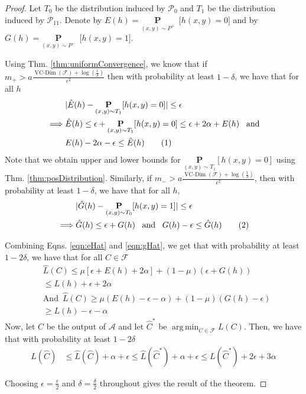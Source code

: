 \documentclass[12pt]{article}
\newcommand{\mb}{\mathbf}
\newcommand{\mc}{\mathcal}
\newcommand\numberthis{\addtocounter{equation}{1}\tag{\theequation}}
\DeclareMathOperator*{\argmin}{arg\,min}
\DeclareMathOperator*{\vcdim}{VC-Dim}
\begin{document}
\begin{proof}
Let $T_0$ be the distribution induced by $\mc P_0$ and $T_1$ be the distribution induced by $\mc P_{11}$. Denote by $E(h) = \underset{(x, y) \sim P^+}{\mb P}\enspace \big[ h(x, y) = 0 ]$ and by $G(h) = \underset{(x, y) \sim P^-}{\mb P}\enspace \big[ h(x, y) = 1 ]$. 

Using Thm. \ref{thm:uniformConvergence}, we know that if $m_+ > a\frac{\vcdim({\mc F}) + \log(\frac{1}{\delta})}{\epsilon^2}$ then with probability at least $1-\delta$, we have that for all $h$
\begin{align*}
  &|\hat E(h) - \underset{(x,y) \sim T_1}{\mb P}[h(x, y) = 0]| \le \epsilon\\
  \implies &\hat E(h) \le \epsilon + \underset{(x,y) \sim T_1}{\mb P}[h(x, y) = 0] \le \epsilon + 2\alpha + E(h) \enspace\text{ and}\\
  &E(h) - 2\alpha -\epsilon \le \hat E(h) \numberthis \label{eqn:eHat}
\end{align*}
Note that we obtain upper and lower bounds for $\underset{(x,y) \sim T_1}{\mb P}[h(x, y) = 0]$ using Thm. \ref{thm:posDistribution}. Similarly, if $m_- > a\frac{\vcdim({\mc F}) + \log(\frac{1}{\delta})}{\epsilon^2}$, then with probability at least $1-\delta$, we have that for all $h$,
\begin{align*}
  &|\hat G(h) - \underset{(x,y) \sim T_0}{\mb P}[h(x, y) = 1]| \le \epsilon\\
  \implies &\hat G(h) \le \epsilon + G(h) \enspace\text{ and } \enspace G(h) -\epsilon \le \hat G(h) \numberthis\label{eqn:gHat}
\end{align*}

\noindent Combining Eqns. \ref{eqn:eHat} and \ref{eqn:gHat}, we get that with probability at least $1-2\delta$, we have that for all $C \in {\mc F}$
\begin{align*}
  &\hat L(C) \le \mu [\epsilon + E(h) + 2\alpha] + (1-\mu)(\epsilon + G(h)) \\
  &\le L(h) + \epsilon + 2\alpha\\
  &\text{And} \enspace \hat L(C) \ge \mu(E(h) -\epsilon - \alpha) + (1-\mu)(G(h) - \epsilon) \\
  &\ge L(h) - \epsilon - \alpha
\end{align*}
Now, let $\hat C$ be the output of $\mc A$ and let $\hat C^*$ be $\argmin_{C \in {\mc F}} L(C)$. Then, we have that with probability at least $1-2\delta$
\begin{align*}
  L(\hat C) &\le \hat L(\hat C) + \alpha + \epsilon \le \hat L(\hat C^*) + \alpha + \epsilon \le L(\hat C^*) + 2\epsilon + 3\alpha 
\end{align*}

Choosing $\epsilon = \frac{\epsilon}{2}$ and $\delta = \frac{\delta}{2}$ throughout gives the result of the theorem.
\end{proof}
\end{document}
